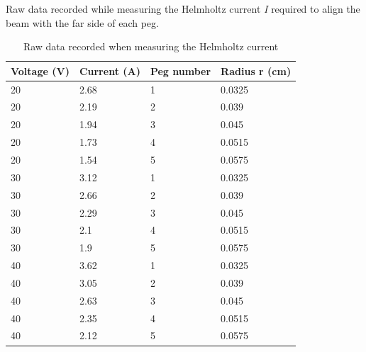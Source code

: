 \documentclass[letterpaper]{article}
\begin{document}
Raw data recorded while measuring the Helmholtz current \textit{I} required
to align the beam with the far side of each peg.
\begin{table}[H]
\centering
\begin{tabular}{|l|l|l|l|}
\hline
Voltage (V) & Current (A) & Peg number & Radius r (cm) \\ \hline
20          & 2.68        & 1          & 0.0325        \\ \hline
20          & 2.19        & 2          & 0.039         \\ \hline
20          & 1.94        & 3          & 0.045         \\ \hline
20          & 1.73        & 4          & 0.0515        \\ \hline
20          & 1.54        & 5          & 0.0575        \\ \hline
30          & 3.12        & 1          & 0.0325        \\ \hline
30          & 2.66        & 2          & 0.039         \\ \hline
30          & 2.29        & 3          & 0.045         \\ \hline
30          & 2.1         & 4          & 0.0515        \\ \hline
30          & 1.9         & 5          & 0.0575        \\ \hline
40          & 3.62        & 1          & 0.0325        \\ \hline
40          & 3.05        & 2          & 0.039         \\ \hline
40          & 2.63        & 3          & 0.045         \\ \hline
40          & 2.35        & 4          & 0.0515        \\ \hline
40          & 2.12        & 5          & 0.0575        \\ \hline
\end{tabular}
\caption{Raw data recorded when measuring the Helmholtz current}
\end{table}
\end{document}
